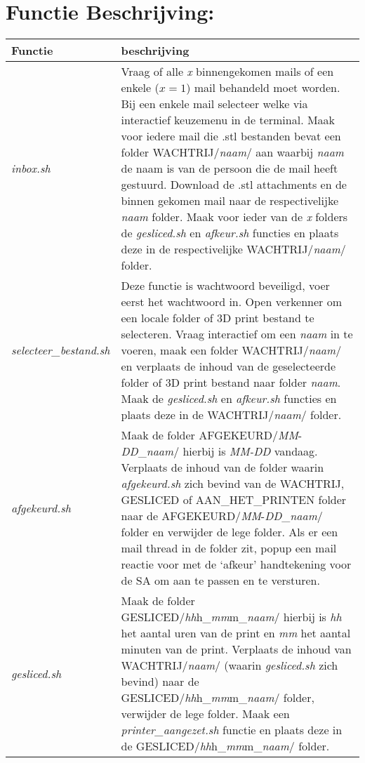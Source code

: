 \documentclass{article}
\begin{document}
\section*{\hspace{-1cm}Functie Beschrijving:}

\begin{table}[H]
\hspace{-2cm}
    \begin{tabular}%
    {>{\raggedright\arraybackslash}p{}%
    |>{\raggedright\arraybackslash}p{}}
    \rowcolor{myblue}
    Functie & beschrijving\\\hline

  \textit{inbox.sh}& Vraag of alle \textit{x} binnengekomen mails of een enkele ($x=1$) mail behandeld moet worden. Bij een enkele mail selecteer welke via interactief keuzemenu in de terminal. Maak voor iedere mail die .stl bestanden bevat een folder WACHTRIJ/\textit{naam}/ aan waarbij \textit{naam} de naam is van de persoon die de mail heeft gestuurd. Download de .stl attachments en de binnen gekomen mail naar de respectivelijke \textit{naam} folder. Maak voor ieder van de \textit{x} folders de \textit{gesliced.sh} en \textit{afkeur.sh} functies en plaats deze in de respectivelijke WACHTRIJ/\textit{naam}/ folder.\\

\textit{selecteer\_bestand.sh}& Deze functie is wachtwoord beveiligd, voer eerst het wachtwoord in. Open verkenner om een locale folder of 3D print bestand te selecteren. Vraag interactief om een \textit{naam} in te voeren, maak een folder WACHTRIJ/\textit{naam}/ en verplaats de inhoud van de geselecteerde folder of 3D print bestand naar folder \textit{naam}. Maak de \textit{gesliced.sh} en \textit{afkeur.sh} functies en plaats deze in de WACHTRIJ/\textit{naam}/ folder.\\

\textit{afgekeurd.sh}& 
Maak de folder AFGEKEURD/\textit{MM}-\textit{DD}\_\textit{naam}/ hierbij is \textit{MM-DD} vandaag. Verplaats de inhoud van de folder waarin \textit{afgekeurd.sh} zich bevind van de WACHTRIJ, GESLICED of AAN\_HET\_PRINTEN folder naar de AFGEKEURD/\textit{MM}-\textit{DD}\_\textit{naam}/ folder en verwijder de lege folder. Als er een mail thread in de folder zit, popup een mail reactie voor met de `afkeur' handtekening voor de SA om aan te passen en te versturen.\\

\textit{gesliced.sh}& Maak de folder GESLICED/\textit{hh}h\_\textit{mm}m\_\textit{naam}/ hierbij is \textit{hh} het aantal uren van de print en \textit{mm} het aantal minuten van de print. Verplaats de inhoud van WACHTRIJ/\textit{naam}/ (waarin \textit{gesliced.sh} zich bevind) naar de GESLICED/\textit{hh}h\_\textit{mm}m\_\textit{naam}/ folder, verwijder de lege folder. Maak een \textit{printer\_aangezet.sh} functie en plaats deze in de GESLICED/\textit{hh}h\_\textit{mm}m\_\textit{naam}/ folder.\\


\end{tabular}
\end{table}
\end{document}
